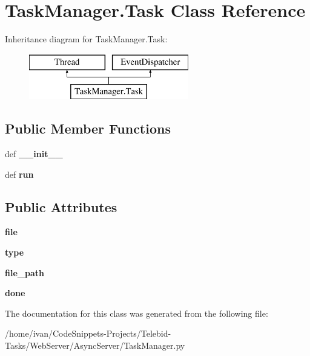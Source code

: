 \hypertarget{class_task_manager_1_1_task}{\section{Task\-Manager.\-Task Class Reference}
\label{class_task_manager_1_1_task}
}
Inheritance diagram for Task\-Manager.\-Task\-:\begin{figure}[H]
\begin{center}
\leavevmode
\includegraphics[height=2.000000cm]{class_task_manager_1_1_task}
\end{center}
\end{figure}
\subsection*{Public Member Functions}
\begin{DoxyCompactItemize}
\item 
\hypertarget{class_task_manager_1_1_task_a90b356b61e49c026c99d5814538c534a}{def {\bfseries \-\_\-\-\_\-init\-\_\-\-\_\-}}\label{class_task_manager_1_1_task_a90b356b61e49c026c99d5814538c534a}

\item 
\hypertarget{class_task_manager_1_1_task_a163d160cf661a7ec691a5c0fadbfe942}{def {\bfseries run}}\label{class_task_manager_1_1_task_a163d160cf661a7ec691a5c0fadbfe942}

\end{DoxyCompactItemize}
\subsection*{Public Attributes}
\begin{DoxyCompactItemize}
\item 
\hypertarget{class_task_manager_1_1_task_aaf5bc8de56df591ae91f7970a0890759}{{\bfseries file}}\label{class_task_manager_1_1_task_aaf5bc8de56df591ae91f7970a0890759}

\item 
\hypertarget{class_task_manager_1_1_task_aa5da638c40484b20cac2ebf1a5b925d7}{{\bfseries type}}\label{class_task_manager_1_1_task_aa5da638c40484b20cac2ebf1a5b925d7}

\item 
\hypertarget{class_task_manager_1_1_task_a3a0a2cdf2a9074e42db218abaa0c4733}{{\bfseries file\-\_\-path}}\label{class_task_manager_1_1_task_a3a0a2cdf2a9074e42db218abaa0c4733}

\item 
\hypertarget{class_task_manager_1_1_task_a69c6b2475d8073b93b030cc0203a22dc}{{\bfseries done}}\label{class_task_manager_1_1_task_a69c6b2475d8073b93b030cc0203a22dc}

\end{DoxyCompactItemize}


The documentation for this class was generated from the following file\-:\begin{DoxyCompactItemize}
\item 
/home/ivan/\-Code\-Snippets-\/\-Projects/\-Telebid-\/\-Tasks/\-Web\-Server/\-Async\-Server/Task\-Manager.\-py\end{DoxyCompactItemize}
